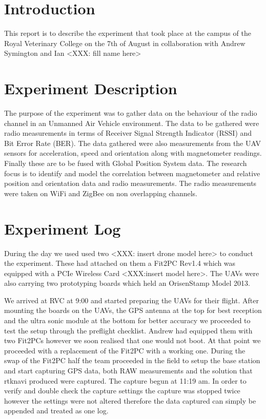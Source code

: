 





\section{Introduction}

This report is to describe the experiment that took place at the campus of the
Royal Veterinary College on the 7th of August in collaboration with Andrew
Symington and Ian <XXX: fill name here>


\section{Experiment Description}
The purpose of the experiment was to gather data on the behaviour of the radio
channel in an Unmanned Air Vehicle environment. The data to be gathered were
radio measurements in terms of Receiver Signal Strength Indicator (RSSI) and Bit
Error Rate (BER). The data gathered were also measurements from the UAV sensors
for acceleration, speed and orientation along with magnetometer readings.
Finally these are to be fused with Global Position System data. The research
focus is to identify and model the correlation between magnetometer and relative
position and orientation data and radio measurements. The radio measurements
were taken on WiFi and ZigBee on non overlapping channels.

\section{Experiment Log}
During the day we used used two <XXX: insert drone model here> to conduct the
experiment. These had attached on them a Fit2PC Rev1.4 which was equipped with a
PCIe Wireless Card <XXX:insert model here>. The UAVs were also carrying two
prototyping boards which held an OrisenStamp Model 2013.

We arrived at RVC at 9:00 and started preparing the UAVs for their flight.
After mounting the boards on the UAVs, the GPS antenna at the top for best
reception and the ultra sonic module at the bottom for better accuracy we
proceeded to test the setup through the preflight checklist. Andrew had equipped
them with two Fit2PCs however we soon realised that one would not boot. At that
point we proceeded with a replacement of the Fit2PC with a working one. During
the swap of the Fit2PC half the team proceeded in the field to setup the base
station and start capturing GPS data, both RAW measurements and the solution
that rtknavi produced were captured. The capture begun at 11:19 am. In order to
verify and double check the capture settings the capture was stopped twice
however the settings were not altered therefore the data captured can simply be
appended and treated as one log.

